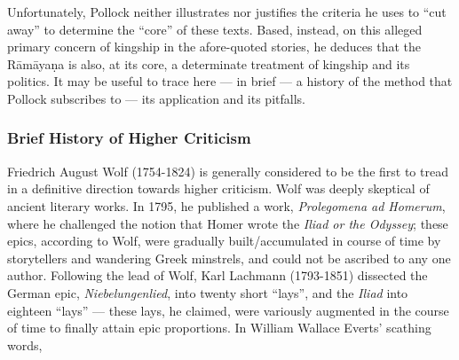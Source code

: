 Unfortunately, Pollock neither illustrates nor justifies the criteria he uses to “cut away” to determine the “core” of these texts. Based, instead, on this alleged primary concern of kingship in the afore-quoted stories, he deduces that the Rāmāyaṇa is also, at its core, a determinate treatment of kingship and its politics. It may be useful to trace here --- in brief --- a history of the method that Pollock subscribes to --- its application and its pitfalls.  


\subsubsection{Brief History of Higher Criticism}\label{sec1.1.1.1}

Friedrich August Wolf (1754-1824) is generally considered to be the first to tread in a definitive direction towards higher criticism. Wolf was deeply skeptical of ancient literary works. In 1795, he published a work, {\sl Prolegomena ad Homerum}, where he challenged the notion that Homer wrote the {\sl Iliad or the Odyssey}; these epics, according to Wolf, were gradually built/accumulated in course of time by storytellers and wandering Greek minstrels, and could not be ascribed to any one author. Following the lead of Wolf, Karl Lachmann (1793-1851) dissected the German epic, {\sl Niebelungenlied}, into twenty short “lays”, and the {\sl Iliad} into eighteen “lays” --- these lays, he claimed, were variously augmented in the course of time to finally attain epic proportions. In William Wallace Everts’ scathing words, 

